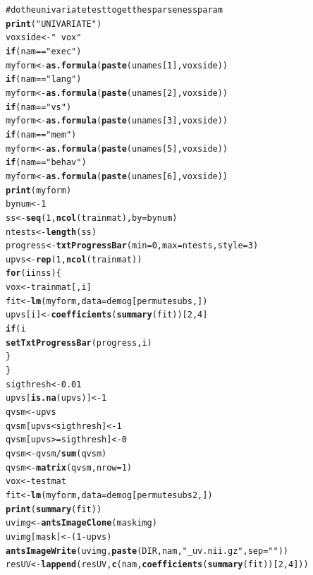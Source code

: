\documentclass[preprint,authoryear,12pt]{elsarticle}
\makeatletter
\newcommand{\hlfunctioncall}[1]{\textcolor[rgb]{0.501960784313725,0,0.329411764705882}{\textbf{#1}}}%
\newcommand{\hlstring}[1]{\textcolor[rgb]{0.6,0.6,1}{#1}}%
\newcommand{\hlcomment}[1]{\textcolor[rgb]{0.180392156862745,0.6,0.341176470588235}{#1}}%
\newenvironment{kframe}{%
 \def\at@end@of@kframe{}%
 \ifinner\ifhmode%
  \def\at@end@of@kframe{\end{minipage}}%
  \begin{minipage}{\columnwidth}%
 \fi\fi%
 \def\FrameCommand##1{\hskip\@totalleftmargin \hskip-\fboxsep
 \colorbox{shadecolor}{##1}\hskip-\fboxsep
     \hskip-\linewidth \hskip-\@totalleftmargin \hskip\columnwidth}%
 \MakeFramed {\advance\hsize-\width
   \@totalleftmargin\z@ \linewidth\hsize
   \@setminipage}}%
 {\par\unskip\endMakeFramed%
 \at@end@of@kframe}
\newenvironment{knitrout}{}{} %
\makeatother
\begin{document}
\begin{knitrout}
\color{fgcolor}\begin{kframe}
\begin{alltt}

\hlcomment{    # do the univariate test to get the sparseness param}
    \hlfunctioncall{print}(\hlstring{"UNIVARIATE"})
    voxside <- \hlstring{" ~ vox "}
    \hlfunctioncall{if} (nam == \hlstring{"exec"}) 
        myform <- \hlfunctioncall{as.formula}(\hlfunctioncall{paste}(unames[1], voxside))
    \hlfunctioncall{if} (nam == \hlstring{"lang"}) 
        myform <- \hlfunctioncall{as.formula}(\hlfunctioncall{paste}(unames[2], voxside))
    \hlfunctioncall{if} (nam == \hlstring{"vs"}) 
        myform <- \hlfunctioncall{as.formula}(\hlfunctioncall{paste}(unames[3], voxside))
    \hlfunctioncall{if} (nam == \hlstring{"mem"}) 
        myform <- \hlfunctioncall{as.formula}(\hlfunctioncall{paste}(unames[5], voxside))
    \hlfunctioncall{if} (nam == \hlstring{"behav"}) 
        myform <- \hlfunctioncall{as.formula}(\hlfunctioncall{paste}(unames[6], voxside))
    \hlfunctioncall{print}(myform)
    bynum <- 1
    ss <- \hlfunctioncall{seq}(1, \hlfunctioncall{ncol}(trainmat), by = bynum)
    ntests <- \hlfunctioncall{length}(ss)
    progress <- \hlfunctioncall{txtProgressBar}(min = 0, max = ntests, style = 3)
    upvs <- \hlfunctioncall{rep}(1, \hlfunctioncall{ncol}(trainmat))
    \hlfunctioncall{for} (i in ss) \{
        vox <- trainmat[, i]
        fit <- \hlfunctioncall{lm}(myform, data = demog[permutesubs, ])
        upvs[i] <- \hlfunctioncall{coefficients}(\hlfunctioncall{summary}(fit))[2, 4]
        \hlfunctioncall{if} (i%
            \hlfunctioncall{setTxtProgressBar}(progress, i)
        \}
    \}
    sigthresh <- 0.01
    upvs[\hlfunctioncall{is.na}(upvs)] <- 1
    qvsm <- upvs
    qvsm[upvs < sigthresh] <- 1
    qvsm[upvs >= sigthresh] <- 0
    qvsm <- qvsm/\hlfunctioncall{sum}(qvsm)
    qvsm <- \hlfunctioncall{matrix}(qvsm, nrow = 1)
    vox <- testmat %
    fit <- \hlfunctioncall{lm}(myform, data = demog[permutesubs2, ])
    \hlfunctioncall{print}(\hlfunctioncall{summary}(fit))
    uvimg <- \hlfunctioncall{antsImageClone}(maskimg)
    uvimg[mask] <- (1 - upvs)
    \hlfunctioncall{antsImageWrite}(uvimg, \hlfunctioncall{paste}(DIR, nam, \hlstring{"_uv.nii.gz"}, sep = \hlstring{""}))
    resUV <- \hlfunctioncall{lappend}(resUV, \hlfunctioncall{c}(nam, \hlfunctioncall{coefficients}(\hlfunctioncall{summary}(fit))[2, 4]))


\end{alltt}
\end{kframe}
\end{knitrout}
\end{document}
